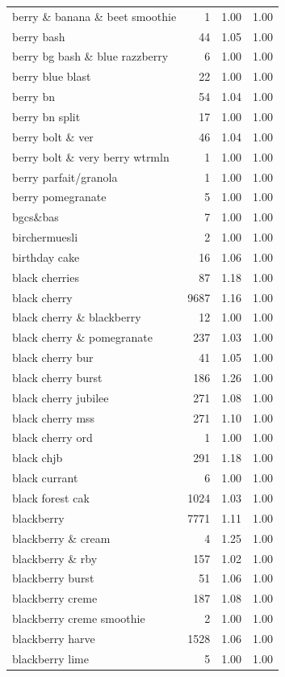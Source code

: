 \begin{table}
\begin{tabular}{lrrr}
berry \& banana \& beet smoothie & 1 & 1.00 & 1.00 \\
berry bash & 44 & 1.05 & 1.00 \\
berry bg bash \& blue razzberry & 6 & 1.00 & 1.00 \\
berry blue blast & 22 & 1.00 & 1.00 \\
berry bn & 54 & 1.04 & 1.00 \\
berry bn split & 17 & 1.00 & 1.00 \\
berry bolt \& ver & 46 & 1.04 & 1.00 \\
berry bolt \& very berry wtrmln & 1 & 1.00 & 1.00 \\
berry parfait/granola & 1 & 1.00 & 1.00 \\
berry pomegranate & 5 & 1.00 & 1.00 \\
bgcs\&bas & 7 & 1.00 & 1.00 \\
birchermuesli & 2 & 1.00 & 1.00 \\
birthday cake & 16 & 1.06 & 1.00 \\
black cherries & 87 & 1.18 & 1.00 \\
black cherry & 9687 & 1.16 & 1.00 \\
black cherry \& blackberry & 12 & 1.00 & 1.00 \\
black cherry \& pomegranate & 237 & 1.03 & 1.00 \\
black cherry bur & 41 & 1.05 & 1.00 \\
black cherry burst & 186 & 1.26 & 1.00 \\
black cherry jubilee & 271 & 1.08 & 1.00 \\
black cherry mss & 271 & 1.10 & 1.00 \\
black cherry ord & 1 & 1.00 & 1.00 \\
black chjb & 291 & 1.18 & 1.00 \\
black currant & 6 & 1.00 & 1.00 \\
black forest cak & 1024 & 1.03 & 1.00 \\
blackberry & 7771 & 1.11 & 1.00 \\
blackberry \& cream & 4 & 1.25 & 1.00 \\
blackberry \& rby & 157 & 1.02 & 1.00 \\
blackberry burst & 51 & 1.06 & 1.00 \\
blackberry creme & 187 & 1.08 & 1.00 \\
blackberry creme smoothie & 2 & 1.00 & 1.00 \\
blackberry harve & 1528 & 1.06 & 1.00 \\
blackberry lime & 5 & 1.00 & 1.00 \\

\end{tabular}
\end{table}
